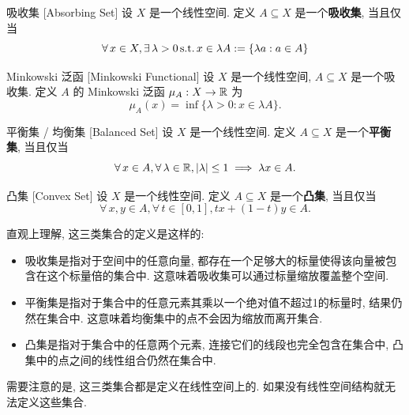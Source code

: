         \begin{dfn}
            [absorbing]
            {吸收集}
            [Absorbing Set]
            设 \(X\) 是一个线性空间. 定义 \(A\subseteq X\) 是一个\textbf{吸收集}, 当且仅当
            \[\forall\,x\in X, \exists\,\lambda>0\operatorname{\text{s.t.}} x\in\lambda A:=\left\{\lambda a : a\in A\right\}\]
        \end{dfn}

        \begin{dfn}
            {Minkowski 泛函}
            [Minkowski Functional]
            设 \(X\) 是一个线性空间, \(A\subseteq X\) 是一个吸收集. 定义 \(A\) 的 Minkowski 泛函 \(\mu_A:X\to\operatorname{\mathbb{R}}\) 为
            \[\mu_A(x)=\inf\{\lambda>0 : x\in\lambda A\}.\]
        \end{dfn}

        \begin{dfn}
            [balanced]
            {平衡集 / 均衡集}
            [Balanced Set]
            设 \(X\) 是一个线性空间. 定义 \(A\subseteq X\) 是一个\textbf{平衡集}, 当且仅当
            \[\forall\,x\in A, \forall\,\lambda\in\operatorname{\mathbb{R}}, |\lambda|\leq 1\implies \lambda x\in A.\]
        \end{dfn}

        \begin{dfn}
            [convex]
            {凸集}
            [Convex Set]
            设 \(X\) 是一个线性空间. 定义 \(A\subseteq X\) 是一个\textbf{凸集}, 当且仅当
            \[\forall\,x,y\in A, \forall\,t\in[0,1], tx+(1-t)y\in A.\]
        \end{dfn}

        \begin{rmk}
            [Dedicatia]
            直观上理解, 这三类集合的定义是这样的:
            \begin{itemize}
                \item 吸收集是指对于空间中的任意向量, 都存在一个足够大的标量使得该向量被包含在这个标量倍的集合中. 这意味着吸收集可以通过标量缩放覆盖整个空间.
                \item 平衡集是指对于集合中的任意元素其乘以一个绝对值不超过1的标量时, 结果仍然在集合中. 这意味着均衡集中的点不会因为缩放而离开集合.
                \item 凸集是指对于集合中的任意两个元素, 连接它们的线段也完全包含在集合中, 凸集中的点之间的线性组合仍然在集合中.
            \end{itemize}
            需要注意的是, 这三类集合都是定义在线性空间上的. 如果没有线性空间结构就无法定义这些集合.
        \end{rmk}

